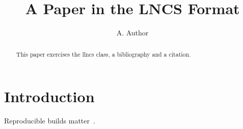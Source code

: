 \documentclass[runningheads]{llncs}
\begin{document}
\title{A Paper in the LNCS Format}
\author{A. Author}

\maketitle

\begin{abstract}
This paper exercises the llncs class, a bibliography and a citation.
\end{abstract}

\section{Introduction}

Reproducible builds matter~\cite{reproducible}.



\end{document}
